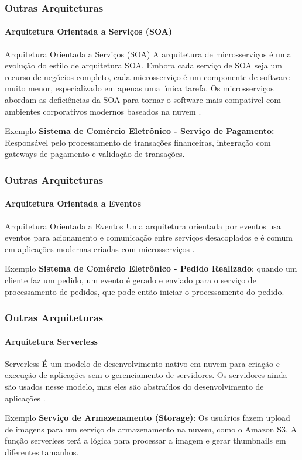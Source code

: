 \documentclass[
	10pt, %
	t, %
]{beamer}
\begin{document}
\begin{frame}
	\frametitle{Outras Arquiteturas}
	\framesubtitle{Arquitetura Orientada a Serviços (SOA)}

	\begin{block}{Arquitetura Orientada a Serviços (SOA)}
		A arquitetura de microsserviços é uma evolução do estilo de arquitetura SOA. Embora cada serviço de SOA seja um \alert{recurso de negócios completo}, cada microsserviço é um componente de software muito menor, especializado em apenas uma única tarefa. Os microsserviços abordam as deficiências da SOA para tornar o software mais compatível com ambientes corporativos modernos baseados na nuvem \parencite{AWSSOA2024}.		
	\end{block}
	\begin{exampleblock}{Exemplo}
		\textbf{Sistema de Comércio Eletrônico - Serviço de Pagamento:} Responsável pelo processamento de transações financeiras, integração com gateways de pagamento e validação de transações.
	\end{exampleblock}
	
\end{frame}

\begin{frame}
	\frametitle{Outras Arquiteturas}
	\framesubtitle{Arquitetura Orientada a Eventos}

	\begin{block}{Arquitetura Orientada a Eventos}
		Uma arquitetura orientada por eventos usa eventos para acionamento e comunicação entre serviços desacoplados e é comum em aplicações modernas criadas com microsserviços \parencite{AWSEVENTOS2024}.
	\end{block}

	\begin{exampleblock}{Exemplo}
		\textbf{Sistema de Comércio Eletrônico - Pedido Realizado}: quando um cliente faz um pedido, um evento é gerado e enviado para o serviço de processamento de pedidos, que pode então iniciar o processamento do pedido.
	\end{exampleblock}
	
\end{frame}

\begin{frame}
	\frametitle{Outras Arquiteturas}
	\framesubtitle{Arquitetura Serverless}

	\begin{block}{Serverless}
		É um modelo de desenvolvimento nativo em nuvem para criação e execução de aplicações sem o gerenciamento de servidores. Os servidores ainda são usados nesse modelo, mas eles são abstraídos do desenvolvimento de aplicações \parencite{REDHAT2024}.
	\end{block}

	\begin{exampleblock}{Exemplo}
		\textbf{Serviço de Armazenamento (Storage)}: Os usuários fazem upload de imagens para um serviço de armazenamento na nuvem, como o Amazon S3. A função serverless terá a lógica para processar a imagem e gerar thumbnails em diferentes tamanhos.
	\end{exampleblock}
	
\end{frame}
\end{document}
